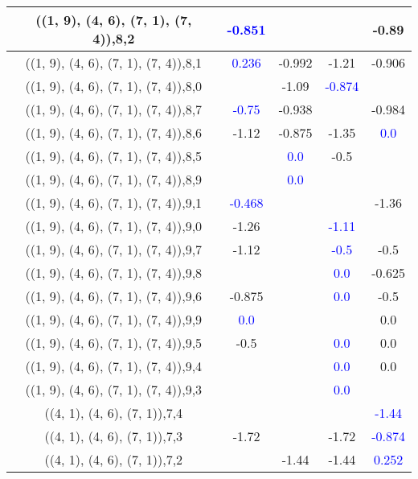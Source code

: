 \documentclass{article}
\begin{document}
\begin{center}
\begin{longtable}{|c|c|c|c|c|}
        	\hline
        	((1, 9), (4, 6), (7, 1), (7, 4)),8,2& \textcolor{blue}{-0.851}&&&-0.89\\
        	\hline
        	((1, 9), (4, 6), (7, 1), (7, 4)),8,1& \textcolor{blue}{0.236}&-0.992&-1.21&-0.906\\
        	\hline
        	((1, 9), (4, 6), (7, 1), (7, 4)),8,0&&-1.09& \textcolor{blue}{-0.874}&\\
        	\hline
        	((1, 9), (4, 6), (7, 1), (7, 4)),8,7& \textcolor{blue}{-0.75}&-0.938&&-0.984\\
        	\hline
        	((1, 9), (4, 6), (7, 1), (7, 4)),8,6&-1.12&-0.875&-1.35& \textcolor{blue}{0.0}\\
        	\hline
        	((1, 9), (4, 6), (7, 1), (7, 4)),8,5&& \textcolor{blue}{0.0}&-0.5&\\
        	\hline
        	((1, 9), (4, 6), (7, 1), (7, 4)),8,9&& \textcolor{blue}{0.0}&&\\
        	\hline
        	((1, 9), (4, 6), (7, 1), (7, 4)),9,1& \textcolor{blue}{-0.468}&&&-1.36\\
        	\hline
        	((1, 9), (4, 6), (7, 1), (7, 4)),9,0&-1.26&& \textcolor{blue}{-1.11}&\\
        	\hline
        	((1, 9), (4, 6), (7, 1), (7, 4)),9,7&-1.12&& \textcolor{blue}{-0.5}&-0.5\\
        	\hline
        	((1, 9), (4, 6), (7, 1), (7, 4)),9,8&&& \textcolor{blue}{0.0}&-0.625\\
        	\hline
        	((1, 9), (4, 6), (7, 1), (7, 4)),9,6&-0.875&& \textcolor{blue}{0.0}&-0.5\\
        	\hline
        	((1, 9), (4, 6), (7, 1), (7, 4)),9,9& \textcolor{blue}{0.0}&&&0.0\\
        	\hline
        	((1, 9), (4, 6), (7, 1), (7, 4)),9,5&-0.5&& \textcolor{blue}{0.0}&0.0\\
        	\hline
        	((1, 9), (4, 6), (7, 1), (7, 4)),9,4&&& \textcolor{blue}{0.0}&0.0\\
        	\hline
        	((1, 9), (4, 6), (7, 1), (7, 4)),9,3&&& \textcolor{blue}{0.0}&\\
        	\hline
        	((4, 1), (4, 6), (7, 1)),7,4&&&& \textcolor{blue}{-1.44}\\
        	\hline
        	((4, 1), (4, 6), (7, 1)),7,3&-1.72&&-1.72& \textcolor{blue}{-0.874}\\
        	\hline
        	((4, 1), (4, 6), (7, 1)),7,2&&-1.44&-1.44& \textcolor{blue}{0.252}\\
        	\hline

\end{longtable}
\end{center}
\end{document}
